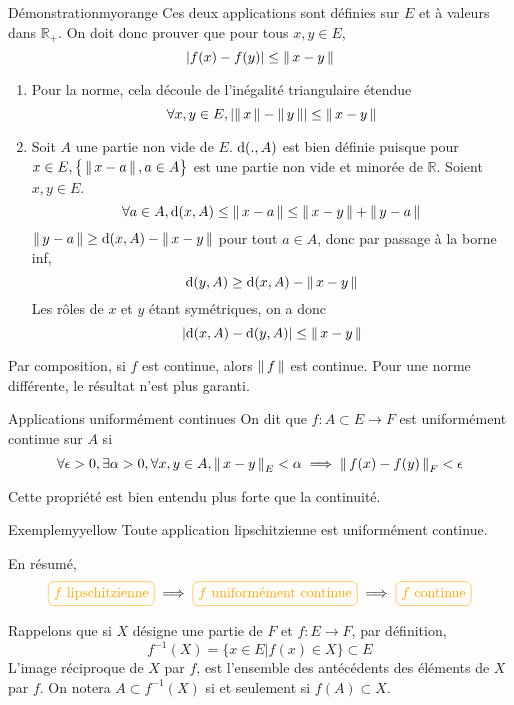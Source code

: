     \begin{demo}{Démonstration}{myorange}
        Ces deux applications sont définies sur $E$ et à valeurs dans $\mathbb{R}_+$. On doit donc prouver que pour tous $x,y \in E$, 
        \[ \left\lvert f(x)-f(y)\right\rvert \leq \left\lVert\,x-y\,\right\rVert \] 
        \begin{enumerate}
            \item Pour la norme, cela découle de l’inégalité triangulaire étendue 
        \[ \forall x,y \in E, \left\lvert \left\lVert\,x\,\right\rVert - \left\lVert\,y\,\right\rVert\right\rvert \leq \left\lVert\,x-y\,\right\rVert \]
            \item Soit $A$ une partie non vide de $E$. $\operatorname{d}(.,A)$ est bien définie puisque pour $x \in E, \big\{ \left\lVert\,x-a\,\right\rVert, a \in A \big\}$ est une partie non vide et minorée de $\mathbb{R}$. Soient $x,y \in E$.
            \[ \forall a \in A, \operatorname{d}(x,A) \leq \left\lVert\,x-a\,\right\rVert \leq \left\lVert\,x-y\,\right\rVert + \left\lVert\,y-a\,\right\rVert \] 
            $\left\lVert\,y-a\,\right\rVert \geq \operatorname{d}(x,A) - \left\lVert\,x-y\,\right\rVert$ pour tout $a \in A$, donc par passage à la borne inf, 
            \[ \operatorname{d}(y,A) \geq \operatorname{d}(x,A) - \left\lVert\,x-y\,\right\rVert \] 
            Les rôles de $x$ et $y$ étant symétriques, on a donc 
            \[ \left\lvert \operatorname{d}(x,A) - \operatorname{d}(y,A)\right\rvert \leq \left\lVert\,x-y\,\right\rVert \] 
        \end{enumerate}

        Par composition, si $f$ est continue, alors $\left\lVert\,f\,\right\rVert$ est continue. Pour une norme différente, le résultat n’est plus garanti.
    \end{demo}

    \begin{defi}{Applications uniformément continues}{}
        On dit que $f : A \subset E \rightarrow F$ est uniformément continue sur $A$ si 
        \[ \forall \epsilon > 0, \exists \alpha > 0, \forall x,y \in A, \left\lVert\,x-y\,\right\rVert_E < \alpha \implies \left\lVert\,f(x)-f(y)\,\right\rVert_F < \epsilon \]
    \end{defi}

    Cette propriété est bien entendu plus forte que la continuité.

    \begin{omed}{Exemple}{myyellow}
        Toute application lipschitzienne est uniformément continue.
    \end{omed}

    En résumé, 
    \[ \lilbox{myyellow}{$f$ lipschitzienne} \implies \lilbox{myyellow}{$f$ uniformément continue} \implies \lilbox{myyellow}{$f$ continue} \]

    Rappelons que si $X$ désigne une partie de $F$ et $f : E \rightarrow F$, par définition,
    \[ f^{-1}(X) = \big\{ x \in E \big| f(x) \in X \big\} \subset E \]
    L’image réciproque de $X$ par $f$, est l’ensemble des antécédents des éléments de $X$ par $f$. On notera $A \subset f^{-1}(X)$ si et seulement si $f(A) \subset X$.

